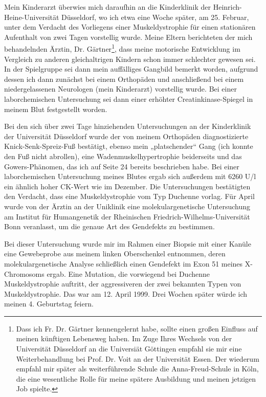 \documentclass[fontsize=14pt,a4paper,headinclude,DIV=calc,automark]{scrbook}
\begin{document}
Mein Kinderarzt überwies mich daraufhin an die Kinderklinik der Heinrich-Heine-Universität Düsseldorf, wo ich etwa eine Woche später, am 25. Februar, unter dem Verdacht des Vorliegens einer Muskeldystrophie für einen stationären Aufenthalt von zwei Tagen vorstellig wurde. Meine Eltern berichteten der mich behandelnden Ärztin, Dr. Gärtner\footnote{Dass ich Fr. Dr. Gärtner kennengelernt habe, sollte einen großen Einfluss auf meinen künftigen Lebensweg haben. Im Zuge Ihres Wechsels von der Universität Düsseldorf an die Universiät Göttingen empfahl sie mir eine Weiterbehandlung bei Prof. Dr. Voit an der Universität Essen. Der wiederum empfahl mir später als weiterführende Schule die Anna-Freud-Schule in Köln, die eine wesentliche Rolle für meine spätere Ausbildung und meinen jetzigen Job spielte.}, dass meine motorische Entwicklung im Vergleich zu anderen gleichaltrigen Kindern schon immer schlechter gewesen sei. In der Spielgruppe sei dann mein auffälliges Gangbild bemerkt worden, aufgrund dessen ich dann zunächst bei einem Orthopäden und anschließend bei einem niedergelassenen Neurologen (mein Kinderarzt) vorstellig wurde. Bei einer laborchemischen Untersuchung sei dann einer erhöhter Creatinkinase-Spiegel in meinem Blut festgestellt worden.

Bei den sich über zwei Tage hinziehenden Untersuchungen an der Kinderklinik der Universität Düsseldorf wurde der von meinem Orthopäden diagnostizierte Knick-Senk-Spreiz-Fuß bestätigt, ebenso mein „platschender“ Gang (ich konnte den Fuß nicht abrollen), eine Wadenmuskelhypertrophie beiderseits und das Gowers-Phänomen, das ich auf Seite 24 bereits beschrieben habe. Bei einer laborchemischen Untersuchung meines Blutes ergab sich außerdem mit 6260 U/l ein ähnlich hoher CK-Wert wie im Dezember. Die Untersuchungen bestätigten den Verdacht, dass eine Muskeldystrophie vom Typ Duchenne vorlag. Für April wurde von der Ärztin an der Uniklinik eine molekulargenetische Untersuchung am Institut für Humangenetik der Rheinischen Friedrich-Wilhelms-Universität Bonn veranlasst, um die genaue Art des Gendefekts zu bestimmen.

Bei dieser Untersuchung wurde mir im Rahmen einer Biopsie mit einer Kanüle eine Gewebeprobe aus meinem linken Oberschenkel entnommen, deren molekulargenetische Analyse schließlich einen Gendefekt im Exon 51 meines X-Chromosoms ergab. Eine Mutation, die vorwiegend bei Duchenne Muskeldystrophie auftritt, der aggressiveren der zwei bekannten Typen von Muskeldystrophie. Das war am 12. April 1999. Drei Wochen später würde ich meinen 4. Geburtstag feiern.
\end{document}
